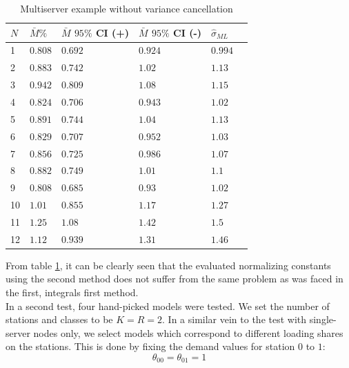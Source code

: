 \begin{table}[!htb] 
\begin{center}
\begin{tabular}{@{}llllll@{}}
\toprule
    \(N\) & \(\bar{M} \%\) & \(\bar{M}\) \(95\%\) CI (+) & \(\bar{M}\) \(95\%\) CI (-) & \(\hat{\sigma}_{ML}\)\\ \midrule
    1 &\(0.808\) & \(0.692\) & \(0.924\) & \(0.994\) &  \\ 
    2 &\(0.883\) & \(0.742\) & \(1.02\) & \(1.13\) &  \\ 
    3 &\(0.942\) & \(0.809\) & \(1.08\) & \(1.15\) &  \\ 
    4 &\(0.824\) & \(0.706\) & \(0.943\) & \(1.02\) &  \\ 
    5 &\(0.891\) & \(0.744\) & \(1.04\) & \(1.13\) &  \\ 
    6 &\(0.829\) & \(0.707\) & \(0.952\) & \(1.03\) &  \\ 
    7 &\(0.856\) & \(0.725\) & \(0.986\) & \(1.07\) &  \\ 
    8 &\(0.882\) & \(0.749\) & \(1.01\) & \(1.1\) &  \\ 
    9 &\(0.808\) & \(0.685\) & \(0.93\) & \(1.02\) &  \\ 
    10 &\(1.01\) & \(0.855\) & \(1.17\) & \(1.27\) &  \\ 
    11 &\(1.25\) & \(1.08\) & \(1.42\) & \(1.5\) &  \\ 
    12 &\(1.12\) & \(0.939\) & \(1.31\) & \(1.46\) &  \\  \bottomrule
\end{tabular}
\end{center}
\caption{Multiserver example without variance cancellation}
\label{tab:Multiserver_no_var_cancel}
\end{table}

From table \ref{tab:Multiserver_no_var_cancel}, it can be clearly seen that the evaluated normalizing constants using the second method does not suffer from the same problem as was faced in the first, integrals first method.\\

In a second test, four hand-picked models were tested. We set the number of stations and classes to be \(K=R=2\). In a similar vein to the test with single-server nodes only, we select models which correspond to different loading shares on the stations. This is done by fixing the demand values for station \(0\) to \(1\):
\[\theta_{00} =\theta_{01} = 1\]

